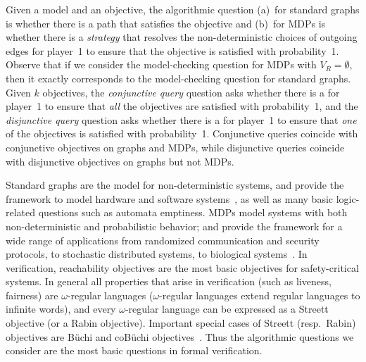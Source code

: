 \documentclass[11pt,letterpaper]{article}
\newcommand{\vr}{V_R\xspace}
\newif\iffullversion
\newcommand{\infull}[1]{\iffullversion #1\fi}
\newcommand{\inshort}[1]{\iffullversion \else #1\fi}
\begin{document}
\smallskip{}
\infull{The algorithmic question given a model and an objective is as follows: 
(a)~for standard graphs, the model-checking question asks whether there is a 
path that satisfies the objective; and 
(b)~for MDPs, the basic model-checking question asks 
}
\inshort{Given a model and an objective, the algorithmic question 
(a)~for standard graphs is whether there is a path that satisfies
the objective and (b)~for MDPs is}
whether there is a 
\infull{\emph{policy} (or a }\emph{strategy} that resolves the 
non-deterministic choices of outgoing 
edges\infull{)} for player~1 to ensure that the objective is satisfied with 
probability~1.
Observe that if we consider the model-checking question for MDPs with 
$\vr=\emptyset$, then it exactly corresponds to the model-checking question 
for standard graphs.
Given $k$ objectives, the \emph{conjunctive query} question asks whether
there is a \infull{policy} for player~1 to ensure that \emph{all}
the objectives 
are satisfied with probability~1, and the \emph{disjunctive query}
question asks whether there is a \infull{policy} for player~1 to ensure that \emph{one}
of the objectives is satisfied with probability~1.
Conjunctive queries coincide with conjunctive objectives on graphs and MDPs,
while disjunctive queries coincide with disjunctive objectives on graphs but not MDPs\infull{ (see 
Observations~\ref{obs:conj} and~\ref{obs:disjgraph})}.

\smallskip{} 
Standard graphs are the model for non-deterministic systems, and provide the 
framework to model hardware and software systems~\cite{SPIN,NUSMV}, as well
as many basic logic-related questions such as automata emptiness. 
MDPs model systems with both non-deterministic and probabilistic behavior; 
and provide the framework for a wide range of applications from randomized 
communication and security protocols, to stochastic distributed systems, 
to biological systems~\cite{prism,baierbook}.
In verification, reachability objectives are the most basic objectives for 
safety-critical systems.
In general all properties that arise in verification (such as liveness, 
fairness) are $\omega$-regular languages ($\omega$-regular languages extend 
regular languages to infinite words), and every $\omega$-regular language can 
be expressed as a Streett objective (or a Rabin objective). Important special
cases of Streett (resp.\ Rabin) objectives are Büchi and coBüchi objectives~\cite{ChatterjeeH14}.
Thus the algorithmic questions we consider are the most basic questions in 
formal verification.
\end{document}
